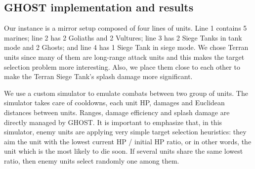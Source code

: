 \documentclass[journal]{IEEEtran}
\newcommand{\minormod}[1]{\color{red} #1\color{black} \xspace}
\newcommand{\ghost}{\textsc{GHOST}\xspace}
\begin{document}
\subsection{\ghost implementation and results}

Our instance is a mirror setup composed of four lines of units. Line 1
contains 5 marines; line 2 has 2 Goliaths and 2 Vultures; line 3 has 2 Siege
Tanks in tank mode  and 2 Ghosts; and line 4 has 1 Siege  Tank in siege mode.
We chose  Terran units  since many of  them are
long-range attack  units and this  makes the target  selection problem
more  interesting.  Also,  we place  them close to each
other to make the Terran Siege Tank's splash damage more significant.

We use a custom simulator to emulate  combats between two group of units. The simulator takes care of
cooldowns,  each  unit HP,  damages and
 Euclidean  distances between units. Ranges,  damage efficiency
and splash damage are directly managed by \ghost.  It is important to
emphasize that, in this simulator, \minormod{enemy units are applying very simple target selection heuristics: they aim the unit with the lowest current HP / initial HP ratio, or in other words, the unit which is the most likely to die soon. If several units share the same lowest ratio, then enemy units select randomly one among them.}
\end{document}
